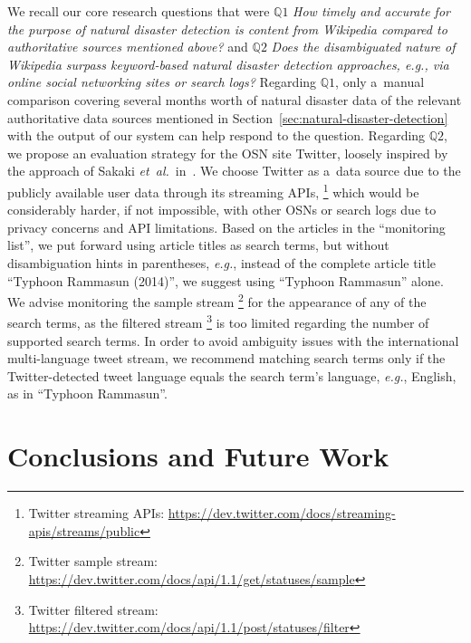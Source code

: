 \documentclass[letterpaper]{article}
\begin{document}
We recall our core research questions that were
$\mathbb{Q}1$ \emph{How timely and accurate for the purpose
of natural disaster detection is content from Wikipedia
compared to authoritative sources mentioned above?} and
$\mathbb{Q}2$ \emph{Does the disambiguated nature of Wikipedia
surpass keyword-based natural disaster detection approaches,
\emph{e.g.}, via online social networking sites or search logs?}
Regarding $\mathbb{Q}1$, only a~manual comparison
covering several months worth
of natural disaster data of the relevant authoritative data sources
mentioned in Section~\ref{sec:natural-disaster-detection}
with the output of our system can help respond to the question.
Regarding $\mathbb{Q}2$, we propose an evaluation strategy
for the OSN site Twitter,
loosely inspired by the approach of Sakaki \emph{et~al.}\
in~\cite{sakaki2010earthquake}.
We choose Twitter as a~data source due to the publicly available user data
through its streaming APIs,%
\footnote{Twitter streaming APIs:
\url{https://dev.twitter.com/docs/streaming-apis/streams/public}}
which would be considerably harder, if not impossible, with other OSNs or search logs
due to privacy concerns and API limitations.
Based on the articles in the ``monitoring list'',
we put forward using article titles as search terms,
but without disambiguation hints in parentheses,
\emph{e.g.}, instead of the complete article title
``Typhoon Rammasun (2014)'', we suggest using ``Typhoon Rammasun'' alone.
We advise monitoring the sample stream%
\footnote{Twitter sample stream:
\url{https://dev.twitter.com/docs/api/1.1/get/statuses/sample}}
for the appearance of any of the search terms,
as the filtered stream%
\footnote{Twitter filtered stream:
\url{https://dev.twitter.com/docs/api/1.1/post/statuses/filter}}
is too limited regarding the number of supported search terms.
In order to avoid ambiguity issues with the
international multi-language tweet stream,
we recommend matching search terms only
if the Twitter-detected tweet language equals
the search term's language, \emph{e.g.}, English, as in ``Typhoon Rammasun''.

\section{Conclusions and Future Work}
\label{sec:Conclusion}
\end{document}

